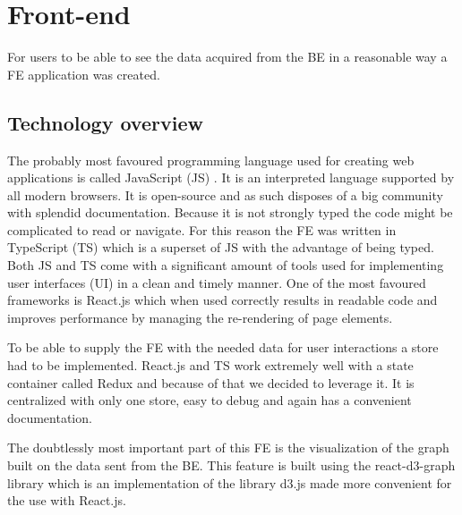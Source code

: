 \section{Front-end}
For users to be able to see the data acquired from the BE in a reasonable way a FE application was created. 
\subsection{Technology overview}
The probably most favoured programming language used for creating web applications \cite{jsGithut} is called JavaScript (JS) \cite{javaScript}. It is an interpreted language supported by all modern browsers. It is open-source and as such disposes of a big community with splendid documentation. Because it is not strongly typed the code might be complicated to read or navigate. For this reason the FE was written in TypeScript (TS) \cite{typeScript} which is a superset of JS with the advantage of being typed. Both JS and TS come with a significant amount of tools used for implementing user interfaces (UI) in a clean and timely manner. One of the most favoured frameworks is React.js \cite{react} which when used correctly results in readable code and improves performance by managing the re-rendering of page elements.


To be able to supply the FE with the needed data for user interactions a store had to be implemented. React.js and TS work extremely well with a state container called Redux \cite{redux} and because of that we decided to leverage it. It is centralized with only one store, easy to debug and again has a convenient documentation. 

The doubtlessly most important part of this FE is the visualization of the graph built on the data sent from the BE. This feature is built using the react-d3-graph library \cite{reactD3Graph} which is 
an implementation of the library d3.js \cite{d3} made more convenient for the use with React.js. 

